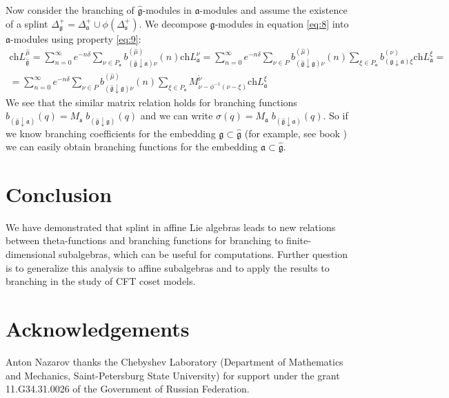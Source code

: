 \documentclass[12pt]{article}
\newcommand{\gf}{\mathfrak{g}}
\newcommand{\af}{\mathfrak{a}}
\newcommand{\sfr}{\mathfrak{s}}
\newcommand{\gfh}{\hat{\mathfrak{g}}}
\begin{document}
Now consider the branching of $\gfh$-modules in $\af$-modules and
assume the existence of a splint
$\Delta^{+}_{\gf}=\Delta^{+}_{\af}\cup \phi(\Delta^{+}_{\sfr})$.
We decompose $\gf$-modules in equation \eqref{eq:8} into
$\af$-modules using property \eqref{eq:9}:
\begin{multline}
  \label{eq:10}
  \mathrm{ch}L^{\hat{\mu}}_{\gfh}=
\sum_{n=0}^{\infty}e^{-n\delta} \sum_{\nu\in P_{\af}} b^{(\hat{\mu})}_{(\gfh\downarrow\af)\nu}(n) \mathrm{ch} L^{\nu}_{\af}=
\sum_{n=0}^{\infty} e^{-n\delta} \sum_{\nu\in P} b^{(\hat{\mu})}_{(\gfh\downarrow\gf )\nu}(n) \sum_{\xi\in P_{\af}} b^{(\nu)}_{(\gf\downarrow \af) \xi}\mathrm{ch} L^{\xi}_{\af}=\\
=\sum_{n=0}^{\infty} e^{-n\delta} \sum_{\nu\in P} b^{(\hat{\mu})}_{(\gfh\downarrow\gf )\nu}(n) \sum_{\xi\in P_{\af}} M^{\widetilde{\nu}}_{  \widetilde{\nu}-\phi^{-1}( \nu-\xi )}\mathrm{ch} L^{\xi}_{\af}
\end{multline}
We see that the similar matrix relation holds for branching
functions $b_{(\gfh\downarrow\af)}(q)= M_{\sfr}\;
b_{(\gfh\downarrow\gf)}(q)$ and we can write
$\sigma(q)=M_{\af}\; b_{(\gfh\downarrow\af)}(q)$. So if we know
branching coefficients for the embedding $\gf\subset\gfh$ (for
example, see book \cite{kass1990ala}) we can easily obtain
branching functions for the embedding $\af\subset \gfh$.
\section*{Conclusion}
\label{sec:conclusion} We have demonstrated that splint in affine
Lie algebras leads to new relations between theta-functions and
branching functions for branching to finite-dimensional
subalgebras, which can be useful for computations. Further
question is to generalize this analysis to affine subalgebras and
to apply the results to branching in the study of CFT coset
models.

\section*{Acknowledgements}
\label{sec:acknowledgements}
Anton Nazarov thanks the Chebyshev Laboratory (Department of Mathematics and Mechanics,
Saint-Petersburg State University) for support under the grant 11.G34.31.0026
of the Government of Russian Federation.

{}

\end{document}
